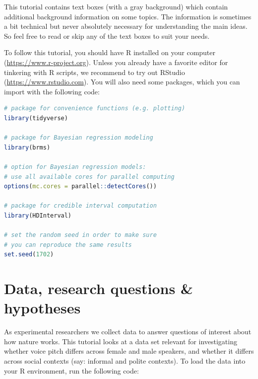\documentclass[nobib]{tufte-handout}
\begin{document}
This tutorial contains text boxes (with a gray background) which contain additional background information on some topics.
The information is sometimes a bit technical but never absolutely necessary for understanding the main ideas.
So feel free to read or skip any of the text boxes to suit your needs.

To follow this tutorial, you should have R installed on your computer (\url{https://www.r-project.org}).
Unless you already have a favorite editor for tinkering with R scripts, we recommend to try out RStudio (\url{https://www.rstudio.com}).
You will also need some packages,
which you can import with the following code:

\bigskip

\begin{minipage}[]{\textwidth}
\begin{lstlisting}[language=R]
# package for convenience functions (e.g. plotting)
library(tidyverse)

# package for Bayesian regression modeling
library(brms)

# option for Bayesian regression models: 
# use all available cores for parallel computing
options(mc.cores = parallel::detectCores())

# package for credible interval computation
library(HDInterval)

# set the random seed in order to make sure 
# you can reproduce the same results
set.seed(1702)
\end{lstlisting}
\end{minipage}

\section{Data, research questions \& hypotheses}
\label{sec:data}

As experimental researchers we collect data to answer questions of interest about how nature works. This tutorial looks at a data set relevant for investigating whether voice pitch differs across female and male speakers, and whether it differs across social contexts (say: informal and polite contexts).
%
\marginnote{}
%
To load the data into your R environment, run the following code:
%
%
\end{document}
